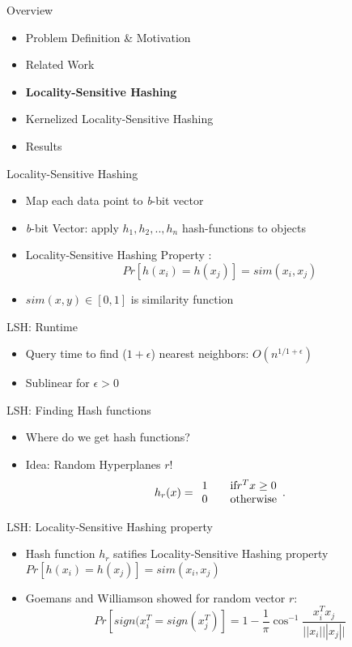 \documentclass[12pt,a4paper]{beamer}
\begin{document}
\begin{frame}{Overview}
\begin{itemize}
\item Problem Definition \& Motivation
\item Related Work
\item \textbf{Locality-Sensitive Hashing}
\item Kernelized Locality-Sensitive Hashing
\item Results
\end{itemize}
\end{frame}





\begin{frame}{Locality-Sensitive Hashing}
\begin{itemize}
\item Map each data point to \textit{b}-bit vector
\item \textit{b}-bit Vector: apply $h_1,h_2,..,h_n$ hash-functions to objects
\item Locality-Sensitive Hashing Property \cite{lsh}: $$Pr[h(x_i)=h(x_j)]=sim(x_i,x_j)$$
\item $sim(x,y) \in [0,1]$ is similarity function
\end{itemize}
\end{frame}

\begin{frame}{LSH: Runtime}
\begin{itemize}
\item Query time to find ($1+\epsilon$) nearest neighbors: $O(n^{1/1+\epsilon})$
\item Sublinear for $\epsilon>0$
\end{itemize}
\end{frame}


\begin{frame}{LSH: Finding Hash functions}
\begin{itemize}
\item Where do we get hash functions?
\item Idea: Random Hyperplanes $r$!
$$h_r(x)= \begin{array}{l l}
    1 & \quad \text{if} r^Tx \geq 0\\
    0 & \quad \text{otherwise}
  \end{array} .$$
\end{itemize}
\end{frame}

\begin{frame}{LSH: Locality-Sensitive Hashing property}
\begin{itemize}
\item Hash function $h_r$ satifies Locality-Sensitive Hashing property $Pr[h(x_i)=h(x_j)]=sim(x_i,x_j)$
\item Goemans and Williamson showed for random vector $r$:
$$Pr[sign(x^T_{i}=sign(x^T_{j})]=1-\frac{1}{\pi}\cos^{-1}\frac{x^{T}_{i} x_{j}}{||x_{i}| ||x_{j}||}$$
\end{itemize}
\end{frame}
\end{document}
